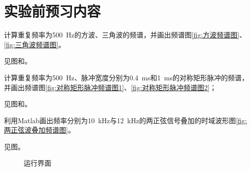 \section{实验前预习内容}%
\label{sec:实验前预习内容\arabic{chapter}}

\begin{Exercise}
	计算重复频率为\SI{500}{Hz}的方波、三角波的频谱，并画出频谱图\ref{fig:方波频谱图}、\ref{fig:三角波频谱图}。
\end{Exercise}

\begin{Answer}
	见图和。
\end{Answer}

\begin{Exercise}
	计算重复频率为\SI{500}{Hz}、脉冲宽度分别为\SI{0.4}{ms}和\SI{1}{ms}的对称矩形脉冲的频谱，并画出频谱图\ref{fig:对称矩形脉冲频谱图1}、\ref{fig:对称矩形脉冲频谱图2}；
\end{Exercise}

\begin{Answer}
	见图和。
\end{Answer}

\begin{Exercise}
	利用Matlab画出频率分别为\SI{10}{kHz}与\SI{12}{kHz}的两正弦信号叠加的时域波形图\ref{fig:两正弦波叠加频谱图}。
\end{Exercise}

\begin{Answer}
	见图。
\end{Answer}





\begin{figure}[htpb]
	\centering
	\caption{运行界面}
	\label{fig:运行界面code13.m}
\end{figure}

